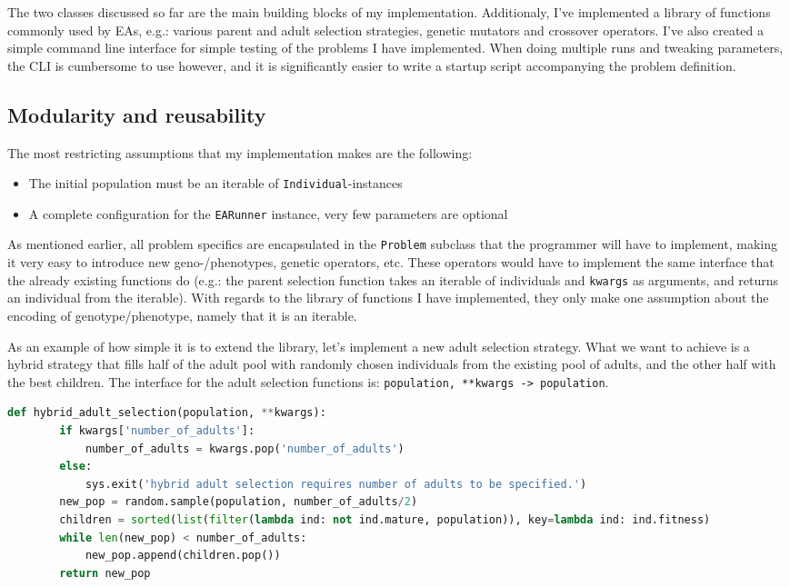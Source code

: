 \documentclass[twoside]{article}
\begin{document}
\begin{multicols}{2}
    The two classes discussed so far are the main building blocks of my implementation.
    Additionaly, I've implemented a library of functions commonly used by EAs, e.g.: various parent and adult selection strategies, genetic mutators and crossover operators.
    I've also created a simple command line interface for simple testing of the problems I have implemented.
    When doing multiple runs and tweaking parameters, the CLI is cumbersome to use however, and it is significantly easier to write a startup script accompanying the problem definition.
    
    \subsection{Modularity and reusability}

    The most restricting assumptions that my implementation makes are the following:

    \begin{itemize}
        \item The initial population must be an iterable of \texttt{Individual}-instances
        \item A complete configuration for the \texttt{EARunner} instance, very few parameters are optional
    \end{itemize}

    As mentioned earlier, all problem specifics are encapsulated in the \texttt{Problem} subclass that the programmer will have to implement, making it very easy to introduce new geno-/phenotypes, genetic operators, etc.
    These operators would have to implement the same interface that the already existing functions do (e.g.: the parent selection function takes an iterable of individuals and \texttt{kwargs} as arguments, and returns an individual from the iterable).
    With regards to the library of functions I have implemented, they only make one assumption about the encoding of genotype/phenotype, namely that it is an iterable.

    As an example of how simple it is to extend the library, let's implement a new adult selection strategy.
    What we want to achieve is a hybrid strategy that fills half of the adult pool with randomly chosen individuals from the existing pool of adults, and the other half with the best children.
    The interface for the adult selection functions is: \texttt{population, **kwargs -> population}.


    \begin{lstlisting}[language=Python, caption=Adult selection, label={lst:adult-selection}]
    def hybrid_adult_selection(population, **kwargs):
        if kwargs['number_of_adults']:
            number_of_adults = kwargs.pop('number_of_adults')
        else:
            sys.exit('hybrid adult selection requires number of adults to be specified.')
        new_pop = random.sample(population, number_of_adults/2)
        children = sorted(list(filter(lambda ind: not ind.mature, population)), key=lambda ind: ind.fitness)
        while len(new_pop) < number_of_adults:
            new_pop.append(children.pop())
        return new_pop
    \end{lstlisting}


\end{multicols}
\end{document}
